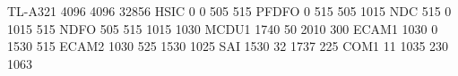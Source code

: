 TL-A321 4096 4096 32856
HSIC            0     0   505   515
PFDFO           0   515   505  1015
NDC           515     0  1015   515
NDFO          505   515  1015  1030
MCDU1        1740    50  2010   300
ECAM1        1030     0  1530   515
ECAM2        1030   525  1530  1025
SAI          1530    32  1737   225
COM1           11  1035   230  1063
